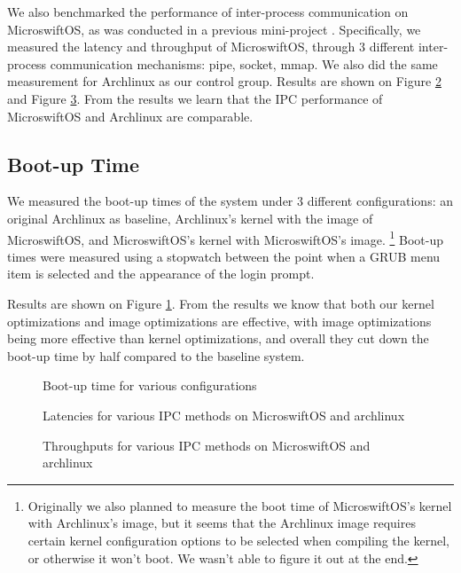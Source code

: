 We also benchmarked the performance of inter-process communication on MicroswiftOS, as was conducted in a previous mini-project \cite{mini}. Specifically, we measured the latency and throughput of MicroswiftOS, through $3$ different inter-process communication mechanisms: pipe, socket, mmap. We also did the same measurement for Archlinux as our control group. Results are shown on Figure \ref{figure:latency} and Figure \ref{figure:throughput}. From the results we learn that the IPC performance of MicroswiftOS and Archlinux are comparable.

\subsection{Boot-up Time}

We measured the boot-up times of the system under $3$ different configurations: an original Archlinux as baseline, Archlinux’s kernel with the image of MicroswiftOS, and MicroswiftOS’s kernel with MicroswiftOS’s image.
\footnote{Originally we also planned to measure the boot time of MicroswiftOS’s kernel with Archlinux’s image, but it seems that the Archlinux image requires certain kernel configuration options to be selected when compiling the kernel, or otherwise it won’t boot.
We wasn’t able to figure it out at the end.}
Boot-up times were measured using a stopwatch between the point when a GRUB menu item is selected and the appearance of the login prompt.

Results are shown on Figure \ref{figure:eval}. From the results we know that both our kernel optimizations and image optimizations are effective, with image optimizations being more effective than kernel optimizations, and overall they cut down the boot-up time by half compared to the baseline system.

\begin{figure}[!htb]
\centering
{}
\caption{Boot-up time for various configurations}
\label{figure:eval}
\end{figure}
\begin{figure}[!htb]
\centering
{}
\caption{Latencies for various IPC methods on MicroswiftOS and archlinux}
\label{figure:latency}
\end{figure}
\begin{figure}[!htb]
\centering
{}
\caption{Throughputs for various IPC methods on MicroswiftOS and archlinux}
\label{figure:throughput}
\end{figure}

